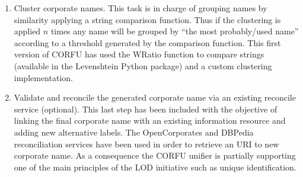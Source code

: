 \documentclass{llncs}
\begin{document}
\begin{enumerate}
\item Cluster corporate names. This task is in charge of grouping names by similarity applying 
a string comparison function. Thus if the clustering is applied $n$ times any name 
will be grouped by ``the most probably/used name'' according to a threshold generated 
by the comparison function. This first version of CORFU has used the WRatio function to 
compare strings (available in the Levenshtein Python package) and a custom clustering 
implementation.

\item Validate and reconcile the generated corporate name via an existing reconcile service (optional). This last 
step has been included with the objective of linking the final corporate name with an existing information 
resource and adding new alternative labels. The OpenCorporates and DBPedia reconciliation services have 
been used in order to retrieve an URI to new corporate name. As a consequence the CORFU unifier is partially supporting 
one of the main principles of the LOD initiative such as unique identification.
\end{enumerate}
% 
%
\end{document}
